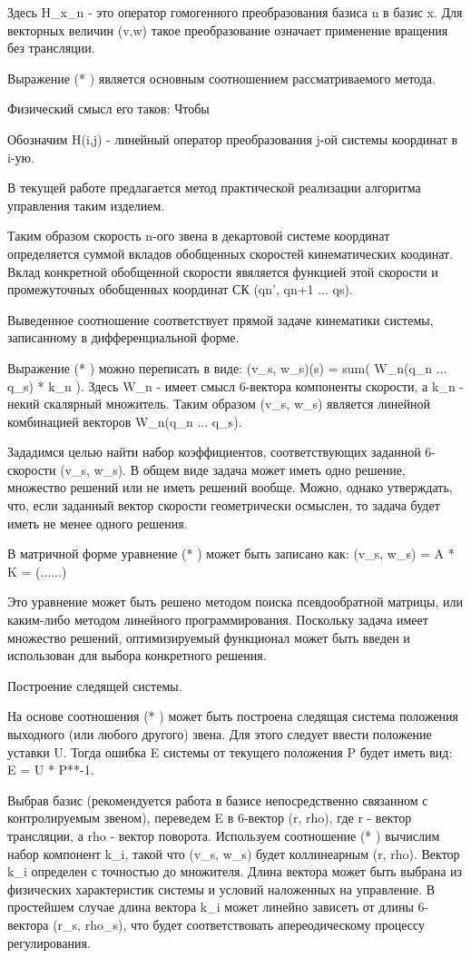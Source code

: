 \documentclass{article}
\begin{document}
Здесь H\_x\_n - это оператор гомогенного преобразования базиса n в базис x. Для векторных величин (v,w) такое преобразование означает применение вращения без трансляции.

Выражение (* ) является основным соотношением рассматриваемого метода.

Физический смысл его таков: Чтобы 

Обозначим H(i,j) - линейный оператор преобразования j-ой системы координат в i-ую. 

В текущей работе предлагается метод практической реализации алгоритма управления таким изделием.

Таким образом скорость n-ого звена в декартовой системе координат определяется суммой вкладов обобщенных скоростей кинематических коодинат. Вклад конкретной обобщенной скорости явяляется функцией этой скорости и промежуточных обобщенных координат СК (qn', qn+1 ... qs).

Выведенное соотношение соответствует прямой задаче кинематики системы, записанному в дифференциальной форме.

Выражение (* ) можно переписать в виде:
(v\_s, w\_s)(s) = sum( W\_n(q\_n ... q\_s) * k\_n ). Здесь W\_n - имеет смысл 6-вектора компоненты скорости, а k\_n - некий скалярный множитель. Таким образом (v\_s, w\_s) является линейной комбинацией векторов W\_n(q\_n ... q\_s).

Зададимся целью найти набор коэффициентов, соответствующих заданной 6-скорости (v\_s, w\_s). В общем виде задача может иметь одно решение, множество решений или не иметь решений вообще. Можно, однако утверждать, что, если заданный вектор скорости геометрически осмыслен, то задача будет иметь не менее одного решения.

В матричной форме уравнение (* ) может быть записано как:
(v\_s, w\_s) = A * K = (......)

Это уравнение может быть решено методом поиска псевдообратной матрицы, или каким-либо методом линейного программирования. Поскольку задача имеет множество решений, оптимизируемый функционал может быть введен и использован для выбора конкретного решения.

Построение следящей системы. 

На основе соотношения (* ) может быть построена следящая система положения выходного (или любого другого) звена. Для этого следует ввести положение уставки U. Тогда ошибка E системы от текущего положения P будет иметь вид:
E = U * P**-1. 

Выбрав базис (рекомендуется работа в базисе непосредственно связанном с контролируемым звеном), переведем E в 6-вектор (r, rho), где r - вектор трансляции, а rho - вектор поворота. Используем соотношение (* ) вычислим набор компонент k\_i, такой что (v\_s, w\_s) будет коллинеарным (r, rho). Вектор k\_i определен с точностью до множителя. Длина вектора может быть выбрана из физических характеристик системы и условий наложенных на управление. В простейшем случае длина вектора k\_i может линейно зависеть от длины 6-вектора (r\_s, rho\_s), что будет соответствовать апереодическому процессу регулирования.   
\end{document}
